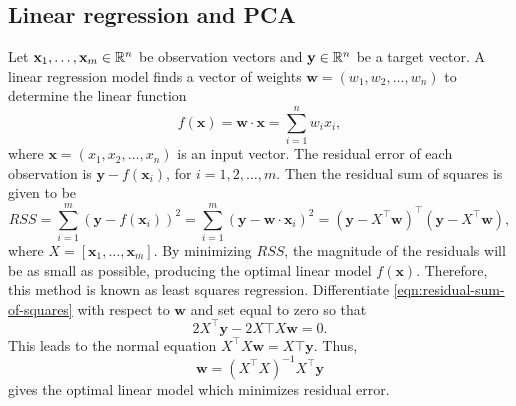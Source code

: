 \subsection{Linear regression and PCA}
\def\vb#1{\mathbf{#1}}
\cite{shawe2004kernel}
Let \(\vb{x}_1, \dots, \vb{x}_m \in \RR^n\) be observation vectors and \(\vb{y} \in \RR^n\) be a target vector.
A linear regression model finds a vector of weights \(\vb{w} = (w_1, w_2, \dots, w_n)\) to determine the linear function
\begin{equation}
    f(\vb{x}) = \vb{w} \cdot \vb{x} = \sum_{i=1}^{n} w_i x_i,
\end{equation}
where \(\vb{x} = (x_1, x_2, \dots, x_n)\) is an input vector.
The residual error of each observation is \(\vb{y} - f(\vb{x}_i)\), for \(i = 1,2, \dots, m\).
Then the residual sum of squares is given to be
\begin{equation}
    \label{eqn:residual-sum-of-squares}
    RSS
    = \sum_{i=1}^{m} (\vb{y} - f(\vb{x}_i))^2
    = \sum_{i=1}^{m} (\vb{y} - \vb{w} \cdot \vb{x}_i)^2
    = (\vb{y} - X^\top \vb{w})^\top (\vb{y} - X^\top \vb{w}),
\end{equation}
where \(X = [\vb{x}_1, \dots, \vb{x}_m]\).
By minimizing \(RSS\), the magnitude of the residuals will be as small as possible, producing the optimal linear model \(f(\vb{x})\).
Therefore, this method is known as least squares regression.
Differentiate \eqref{eqn:residual-sum-of-squares} with respect to \(\vb{w}\) and set equal to zero so that
\begin{equation}
    2 X^\top \vb{y} - 2 X\top X \vb{w} = 0.
\end{equation}
This leads to the normal equation \(X^\top X \vb{w} = X\top \vb{y}\).
Thus,
\begin{equation}
    \vb{w} = (X^\top X)^{-1} X^\top \vb{y}
\end{equation}
gives the optimal linear model which minimizes residual error.

